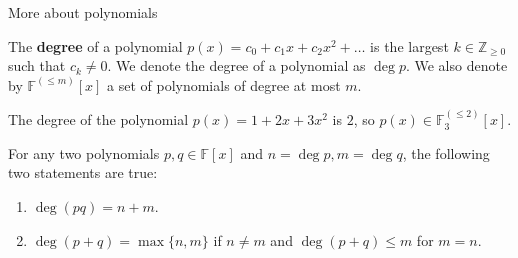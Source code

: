 \documentclass{beamer}
\begin{document}
    \begin{frame}{More about polynomials}
      \begin{definition}
          The \textbf{degree} of a polynomial $p(x) = c_0+c_1x+c_2x^2+\dots$ is the largest $k \in \mathbb{Z}_{\geq 0}$ such that $c_k \neq 0$. We denote the degree of a polynomial as $\deg p$. We also denote by $\mathbb{F}^{(\leq m)}[x]$ a set of polynomials of degree at most $m$.
      \end{definition}
      
      \begin{example}
          The degree of the polynomial $p(x) = 1 + 2x + 3x^2$ is $2$, so $p(x) \in \mathbb{F}_3^{(\leq 2)}[x]$.
      \end{example}
      
      \begin{theorem}
          For any two polynomials $p,q \in \mathbb{F}[x]$ and $n = \deg p, m = \deg q$, the following two statements are true:
          \begin{enumerate}
              \item $\deg (pq) = n + m$.
              \item $\deg (p + q) = \max\{n,m\}$ if $n \neq m$ and $\deg (p+q) \leq m$ for $m=n$.
          \end{enumerate}
      \end{theorem}
    \end{frame}
\end{document}
